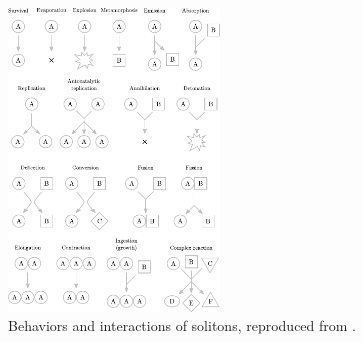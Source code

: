 \begin{figure}
\centering
\includegraphics[width=0.5\textwidth]{img/lenia-event-types}
\caption{Behaviors and interactions of solitons, reproduced from \citep{chan2020lenia}.}
\label{fig:lenia-event-types}
\end{figure}
